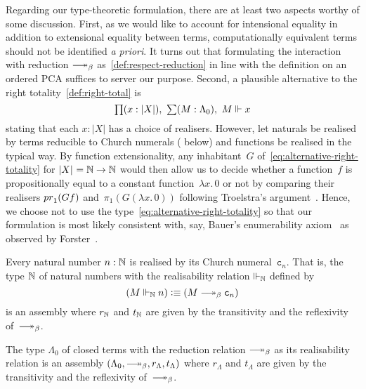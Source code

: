 \documentclass[a4paper,UKenglish,numberwithinsect,cleveref,thm-restate]{lipics-v2021}
\numberwithin{equation}{section}
\theoremstyle{plain}
\begin{document}
Regarding our type-theoretic formulation, there are at least two aspects worthy of some discussion.
First, as we would like to account for intensional equality in addition to extensional equality between terms,
computationally equivalent terms should not be identified \emph{a priori}.
It turns out that formulating the interaction with reduction $\reduce$ as~\eqref{def:respect-reduction} in line with the definition on an ordered PCA suffices to server our purpose.
Second, a plausible alternative to the right totality~\eqref{def:right-total} is
\begin{equation}\label{eq:alternative-right-totality}
  \lprd{x : |X|} \lsm{M : \Lambda_0} M \Vdash x
\end{equation}
stating that each $x : |X|$ has a choice of realisers.
However, let naturals be realised by terms reducible to Church numerals ( below) and functions be realised in the typical way.
By function extensionality, any inhabitant~$G$ of~\eqref{eq:alternative-right-totality} for $\mathopen{}\left|X\right|_{}^{}\mathclose{} = \mathbb{N} \to \mathbb{N}$ would then allow us to decide whether a function~$f$ is propositionally equal to a constant function~$\lambda x.\, 0$ or not by comparing their realisers $\pr_1(Gf)$ and~$\pi_1(G(\lambda x.\, 0))$ following Troelstra's argument~\cite{Troelstra1977}.
Hence, we choose not to use the type~\eqref{eq:alternative-right-totality} so that our formulation is most likely consistent with, say, Bauer's enumerability axiom~\cite{Bauer2006} as observed by Forster~\cite{forster2021}.

\begin{example} \label{ex:assembly-naturals}
  Every natural number $n : \mathbb{N}$ is realised by its Church numeral~$\mathtt{c}_n$.
  That is, the type $\mathbb{N}$ of natural numbers with the realisability relation $\Vdash_{\mathbb{N}}$ defined by
  \[
    \left(M \Vdash_\Nat n\right) \defeq \left(M \reduce \mathtt{c}_n\right)
  \]
  is an assembly where $r_\mathbb{N}$ and $t_\mathbb{N}$ are given by the transitivity and the reflexivity of~$\reduce$.
\end{example}

\begin{example}\label{ex:assembly-lambda}
  The type $\Lambda_0$ of closed terms with the reduction relation ${\reduce}$ as its realisability relation is an assembly $(\Lambda_0, \reduce, r_\Lambda, t_\Lambda)$ where $r_\Lambda$ and $t_\Lambda$ are given by the transitivity and the reflexivity of~$\reduce$.
\end{example}
\end{document}
